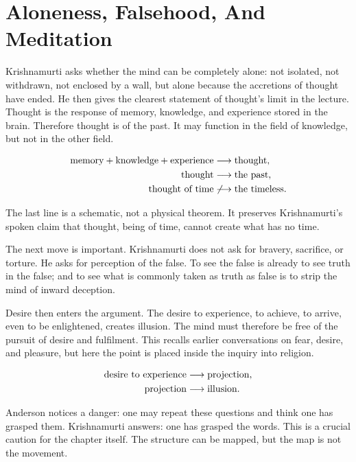 \section{Aloneness, Falsehood, And Meditation}

Krishnamurti asks whether the mind can be completely alone: not isolated, not withdrawn, not enclosed by a wall, but alone because the accretions of thought have ended. He then gives the clearest statement of thought's limit in the lecture. Thought is the response of memory, knowledge, and experience stored in the brain. Therefore thought is of the past. It may function in the field of knowledge, but not in the other field.

\begin{align}
\hbox{memory} + \hbox{knowledge} + \hbox{experience}
&\longrightarrow \hbox{thought},\\
\hbox{thought} &\longrightarrow \hbox{the past},\\
\hbox{thought of time} &\not\longrightarrow \hbox{the timeless}.
\end{align}

The last line is a schematic, not a physical theorem. It preserves Krishnamurti's spoken claim that thought, being of time, cannot create what has no time.

The next move is important. Krishnamurti does not ask for bravery, sacrifice, or torture. He asks for perception of the false. To see the false is already to see truth in the false; and to see what is commonly taken as truth as false is to strip the mind of inward deception.

Desire then enters the argument. The desire to experience, to achieve, to arrive, even to be enlightened, creates illusion. The mind must therefore be free of the pursuit of desire and fulfilment. This recalls earlier conversations on fear, desire, and pleasure, but here the point is placed inside the inquiry into religion.

\begin{align}
\hbox{desire to experience}
&\longrightarrow \hbox{projection},\\
\hbox{projection}
&\longrightarrow \hbox{illusion}.
\end{align}

Anderson notices a danger: one may repeat these questions and think one has grasped them. Krishnamurti answers: one has grasped the words. This is a crucial caution for the chapter itself. The structure can be mapped, but the map is not the movement.

